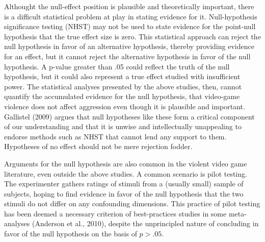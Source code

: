 \documentclass[fignum,nobf,man]{apa}
\begin{document}
Althought the null-effect position is plausible and theoretically important, there is a difficult statistical problem at play in stating evidence for it. Null-hypothesis significance testing (NHST) may not be used to state evidence for the point-null hypothesis that the true effect size is zero. This statistical approach can reject the null hypothesis in favor of an alternative hypothesis, thereby providing evidence for an effect, but it cannot reject the alternative hypothesis in favor of the null hypothesis. A p-value greater than .05 could reflect the truth of the null hypothesis, but it could also represent a true effect studied with insufficient power. The statistical analyses presented by the above studies, then, cannot quantify the accumulated evidence for the null hypothesis, that video-game violence does not affect aggression even though it is plausible and important. Gallistel (2009) argues that null hypotheses like these form a critical component of our understanding %
and that it is unwise and intellectually unappealing to endorse methods such as NHST that cannot lend any support to them. Hypotheses of no effect should not be mere rejection fodder.

Arguments for the null hypothesis are also common in the violent video game literature, even outside the above studies. A common scenario is pilot testing. The experimenter gathers ratings of stimuli from a (usually small) sample of subjects, hoping to find evidence in favor of the null hypothesis that the two stimuli do not differ on any confounding dimensions. This practice of pilot testing has been deemed a necessary criterion of best-practices studies in some meta-analyses (Anderson et al., 2010), despite the unprincipled nature of concluding in favor of the null hypothesis on the basis of $p > .05$.
\end{document}
